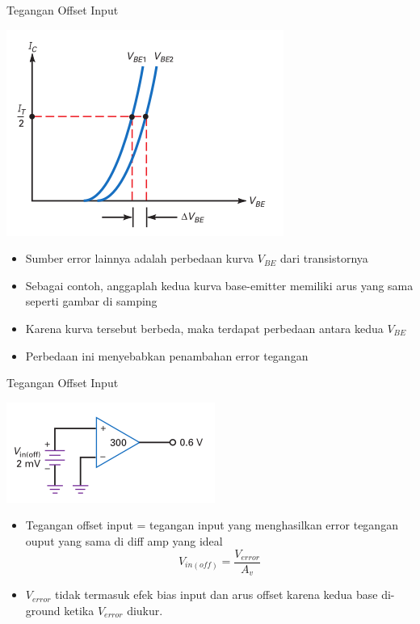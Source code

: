 \documentclass[aspectratio=169]{beamer}
\begin{document}
\begin{frame}{Tegangan Offset Input}
	\begin{multicols}{2}
		\begin{center}
			\includegraphics[height=0.7\textheight]{gambar/01.different_base-emitter_curves_added_to_error}
		\end{center}
		\columnbreak
		\begin{itemize}
			\item Sumber error lainnya adalah perbedaan kurva $ V_{BE} $ dari transistornya
			\item Sebagai contoh, anggaplah kedua kurva base-emitter memiliki arus yang sama seperti gambar di samping
			\item Karena kurva tersebut berbeda, maka terdapat perbedaan antara kedua $ V_{BE} $
			\item Perbedaan ini menyebabkan penambahan error tegangan
		\end{itemize}
	\end{multicols}
\end{frame}

\begin{frame}{Tegangan Offset Input}
	\begin{multicols}{2}
		\begin{center}
			\includegraphics[height=0.4\textheight]{gambar/01.input_offset_voltage_is_equivalent_to_an_unwanted_input_voltage}
		\end{center}
		\columnbreak
		\begin{itemize}
			\item Tegangan offset input = tegangan input yang menghasilkan error tegangan ouput yang sama di diff amp yang ideal
			\begin{equation}
				V_{in(off)} = \frac{V_{error}}{A_v}
			\end{equation}
			\item $ V_{error} $ tidak termasuk efek bias input dan arus offset karena kedua base di-ground ketika $ V_{error} $ diukur.
		\end{itemize}
	\end{multicols}
\end{frame}
\end{document}
